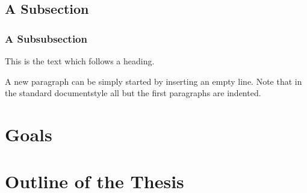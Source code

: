 \subsection{A Subsection}

\subsubsection{A Subsubsection}

This is the text which follows a heading.

A new paragraph can be simply started by inserting an empty line.  Note that in the standard documentstyle all but the first paragraphs are indented. 

\section{Goals}

\section{Outline of the Thesis}

